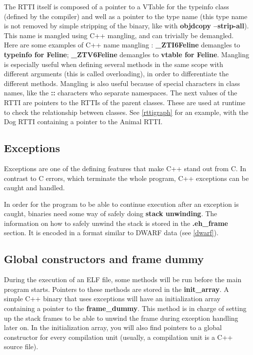 \documentclass[a4paper,11pt,oneside]{report}
\begin{document}
The RTTI itself is composed of a pointer to a VTable for the typeinfo class 
(defined by the compiler) and well as a pointer to the type name (this type 
name is not removed by simple stripping of the binary, like with 
\textbf{objdcopy --strip-all}).
This name is mangled using C++ mangling, and can trivially be demangled.
Here are some examples of C++ name mangling :
\textbf{\_ZTI6Feline} demangles to \textbf{typeinfo for Feline};
\textbf{\_ZTV6Feline} demangles to \textbf{vtable for Feline}.
Mangling is especially useful when defining several methods in the same scope 
with different arguments (this is called overloading), in order to
differentiate the different methods.
Mangling is also useful because of special characters in class names, like the
\textbf{::} characters who separate namespaces.
The next values of the RTTI are pointers to the RTTIs of the parent classes.
These are used at runtime to check the relationship between classes.
See \autoref{rttigraph} for an example, with the Dog RTTI containing a pointer 
to the Animal RTTI.


\subsection{Exceptions}
\label{exceptions}

Exceptions are one of the defining features that make C++ stand out from C.
In contrast to C errors, which terminate the whole program, C++ exceptions
can be caught and handled.

In order for the program to be able to continue execution after an exception
is caught, binaries need some way of safely doing \textbf{stack unwinding}.
The information on how to safely unwind the stack is stored in the
\textbf{.eh\_frame} section. It is encoded in a format similar to DWARF data
(see \autoref{dwarf}).

\subsection{Global constructors and frame dummy}
\label{framedummy}

During the execution of an ELF file, some methods will be run before the main
program starts. Pointers to these methods are stored in the
\textbf{init\_array}.
A simple C++ binary that uses exceptions will have an initialization array
containing a pointer to the \textbf{frame\_dummy}. This method is in charge of
setting up the stack frames to be able to unwind the frame during exception
handling later on.
In the initialization array, you will also find pointers to a global
constructor for every compilation unit (usually, a compilation unit is a C++
source file).
\end{document}
